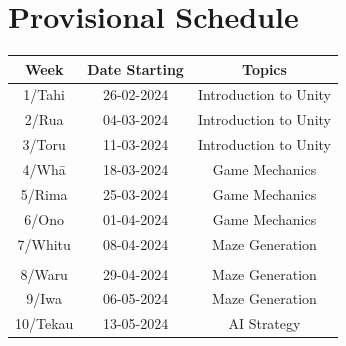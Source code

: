 \documentclass{article}
\begin{document}
\section*{Provisional Schedule}
\renewcommand{\arraystretch}{1.5}
\begin{tabular}{|c|c|c|c|}
	\hline
	\textbf{Week}                  & \textbf{Date Starting}            & \multicolumn{2}{c|}{\textbf{Topics}}                                                                                             \\ \hline
	\footnotesize 1/Tahi           & \footnotesize 26-02-2024 & \multicolumn{2}{c|}{\footnotesize Introduction to Unity}    \\ \hline
	\footnotesize 2/Rua            & \footnotesize 04-03-2024 & \multicolumn{2}{c|}{\footnotesize Introduction to Unity}                   \\ \hline
	\footnotesize 3/Toru           & \footnotesize 11-03-2024 & \multicolumn{2}{c|}{\footnotesize Introduction to Unity} \\ \hline
	\footnotesize 4/Whā            & \footnotesize 18-03-2024 & \multicolumn{2}{c|}{\footnotesize Game Mechanics}                               \\ \hline
	\footnotesize 5/Rima           & \footnotesize 25-03-2024 & \multicolumn{2}{c|}{\footnotesize Game Mechanics}                                                \\ \hline
	\footnotesize 6/Ono            & \footnotesize 01-04-2024  & \multicolumn{2}{c|}{\footnotesize Game Mechanics}                                                   \\ \hline
	\footnotesize 7/Whitu          & \footnotesize 08-04-2024 &  \multicolumn{2}{c|}{\footnotesize Maze Generation}                            \\ \hline
	\rowcolor{yellow} \multicolumn{4}{|c|}{\footnotesize Mid Term Break}                                                                                                                         \\ \hline
	\footnotesize 8/Waru   & \footnotesize 29-04-2024 & \multicolumn{2}{c|}{\footnotesize Maze Generation}                                                   \\ \hline
	\footnotesize 9/Iwa            & \footnotesize 06-05-2024 & \multicolumn{2}{c|}{\footnotesize Maze Generation}                                                                 \\ \hline
	\footnotesize 10/Tekau         & \footnotesize 13-05-2024 & \multicolumn{2}{c|}{\footnotesize AI Strategy}                                                                 \\ \hline

\end{tabular}
\end{document}
